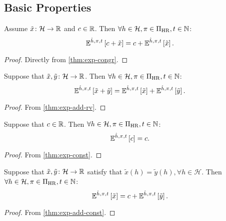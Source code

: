 \subsection{Basic Properties}


\begin{theorem} \label{thm:exph-congr}
Assume $\tilde{x} \colon \mathcal{H} \to \mathbb{R}$ and $c \in \mathbb{R}$. Then $\forall h\in \mathcal{H}, \pi\in \Pi_{\mathrm{HR}}, t \in \mathbb{N}$:
\[
  \mathbb{E}^{\hat{h}, \pi, t} \left[ c + \tilde{x} \right]
  =
  c + \mathbb{E}^{\hat{h}, \pi, t} \left[ \tilde{x} \right].
\]
 \leanok
\end{theorem}
\begin{proof}
Directly from \cref{thm:exp-congr}. 
\end{proof}

\begin{theorem} \label{thm:exph-add-rv}
Suppose that $\tilde{x}, \tilde{y} \colon \mathcal{H} \to \mathbb{R} $. Then $\forall h\in \mathcal{H}, \pi\in \Pi_{\mathrm{HR}}, t \in \mathbb{N}$:
\[
  \mathbb{E}^{\hat{h}, \pi, t} \left[ \tilde{x} + \tilde{y} \right]
  =
  \mathbb{E}^{\hat{h}, \pi, t} \left[ \tilde{x} \right] + \mathbb{E}^{\hat{h}, \pi, t} \left[ \tilde{y} \right].
\]
\end{theorem}
\begin{proof}
  From \cref{thm:exp-add-rv}.
\end{proof}

\begin{theorem} \label{thm:exph-const}
Suppose that $c\in \mathbb{R}$. Then $\forall h\in \mathcal{H}, \pi\in \Pi_{\mathrm{HR}}, t \in \mathbb{N}$:
\[
  \mathbb{E}^{\hat{h}, \pi, t} \left[ c \right] = c.
\]
\end{theorem}
\begin{proof}
  From \cref{thm:exp-const}.
\end{proof}

\begin{theorem} \label{thm:exph-add-const}
Suppose that $\tilde{x}, \tilde{y} \colon \mathcal{H} \to \mathbb{R} $ satisfy that $\tilde{x}(h) = \tilde{y}(h), \forall h \in \mathcal{H}$. Then $\forall h\in \mathcal{H}, \pi\in \Pi_{\mathrm{HR}}, t \in \mathbb{N}$:
\[
  \mathbb{E}^{\hat{h}, \pi, t} \left[ \tilde{x} \right]
  =
  c + \mathbb{E}^{\hat{h}, \pi, t} \left[ \tilde{y} \right].
\]
\end{theorem}
\begin{proof}
From \cref{thm:exp-add-const}.
\end{proof}

